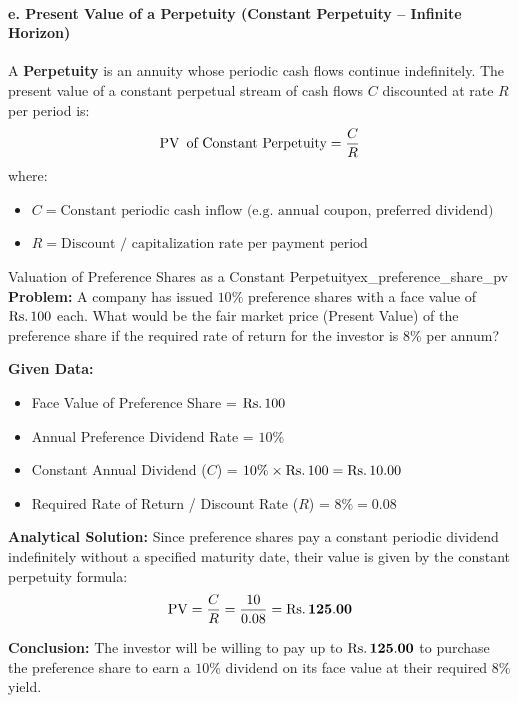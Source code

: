 \begin{formulabox}
\paragraph{e. Present Value of a Perpetuity (Constant Perpetuity -- Infinite Horizon)}
A \textbf{Perpetuity} is an annuity whose periodic cash flows continue indefinitely. The present value of a constant perpetual stream of cash flows $C$ discounted at rate $R$ per period is:
\begin{equation}
    \operatorname{PV} \text{ of Constant Perpetuity} = \frac{C}{R}
\end{equation}
where:
\begin{itemize}[noitemsep]
    \item $C = \text{Constant periodic cash inflow (e.g. annual coupon, preferred dividend)}$
    \item $R = \text{Discount / capitalization rate per payment period}$
\end{itemize}
\end{formulabox}

\begin{example}{Valuation of Preference Shares as a Constant Perpetuity}{ex_preference_share_pv}
\textbf{Problem:}
A company has issued $10\%$ preference shares with a face value of $\text{Rs.}\, 100$ each. What would be the fair market price (Present Value) of the preference share if the required rate of return for the investor is $8\%$ per annum?

\tcbline
\textbf{Given Data:}
\begin{itemize}[noitemsep]
    \item Face Value of Preference Share = $\text{Rs.}\, 100$
    \item Annual Preference Dividend Rate = $10\%$
    \item Constant Annual Dividend ($C$) = $10\% \times \text{Rs.}\, 100 = \text{Rs.}\, 10.00$
    \item Required Rate of Return / Discount Rate ($R$) = $8\% = 0.08$
\end{itemize}

\textbf{Analytical Solution:}
Since preference shares pay a constant periodic dividend indefinitely without a specified maturity date, their value is given by the constant perpetuity formula:
\begin{equation*}
    \operatorname{PV} = \frac{C}{R} = \frac{10}{0.08} = \mathbf{\text{Rs.}\, 125.00}
\end{equation*}

\textbf{Conclusion:}
The investor will be willing to pay up to $\mathbf{\text{Rs.}\, 125.00}$ to purchase the preference share to earn a $10\%$ dividend on its face value at their required $8\%$ yield.
\end{example}

